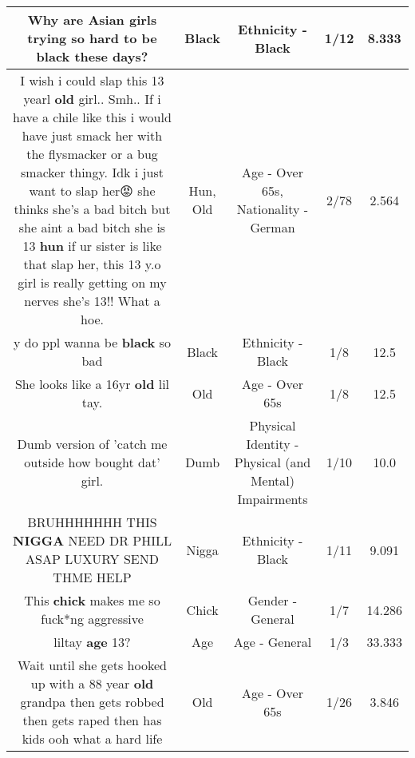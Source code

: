 \documentclass[11pt]{article}
\newlength\mylength
\begin{document}
\begin{center}
\begin{longtable}{|C{.65\mylength}|C{.30\mylength}|C{.12\mylength}|C{.12\mylength}|C{.12\mylength}|}
  \small Why are Asian girls trying so hard to be \textbf{black} these days?\normalsize   & Black & Ethnicity - Black & 1/12 & 8.333 \\  \hline
  \small I wish i could slap this 13 yearl \textbf{old} girl.. Smh.. If i have a chile like this i would have just smack her with the flysmacker or a bug smacker thingy. Idk i just want to slap her😡 she thinks she's a bad bitch but she aint a bad bitch she is 13 \textbf{hun} if ur sister is like that slap her, this 13 y.o girl is really getting on my nerves she's 13!! What a hoe.\normalsize   & Hun, Old & Age - Over 65s, Nationality - German & 2/78 & 2.564 \\  \hline
  \small y do ppl wanna be \textbf{black} so bad\normalsize   & Black & Ethnicity - Black & 1/8 & 12.5 \\  \hline
  \small She looks like a 16yr \textbf{old} lil tay.\normalsize   & Old & Age - Over 65s & 1/8 & 12.5 \\  \hline
  \small Dumb version of 'catch me outside how bought dat' girl.\normalsize   & Dumb & Physical Identity - Physical (and Mental) Impairments & 1/10 & 10.0 \\  \hline
  \small BRUHHHHHHH THIS \textbf{NIGGA} NEED DR PHILL ASAP LUXURY SEND THME HELP\normalsize   & Nigga & Ethnicity - Black & 1/11 & 9.091 \\  \hline
  \small This \textbf{chick} makes me so fuck*ng aggressive\normalsize   & Chick & Gender - General & 1/7 & 14.286 \\  \hline
  \small liltay \textbf{age} 13?\normalsize   & Age & Age - General & 1/3 & 33.333 \\  \hline
  \small Wait until she gets hooked up with a 88 year \textbf{old} grandpa then gets robbed then gets raped then has kids ooh what a hard life\normalsize   & Old & Age - Over 65s & 1/26 & 3.846 \\  \hline

\end{longtable}
\end{center}
\end{document}
